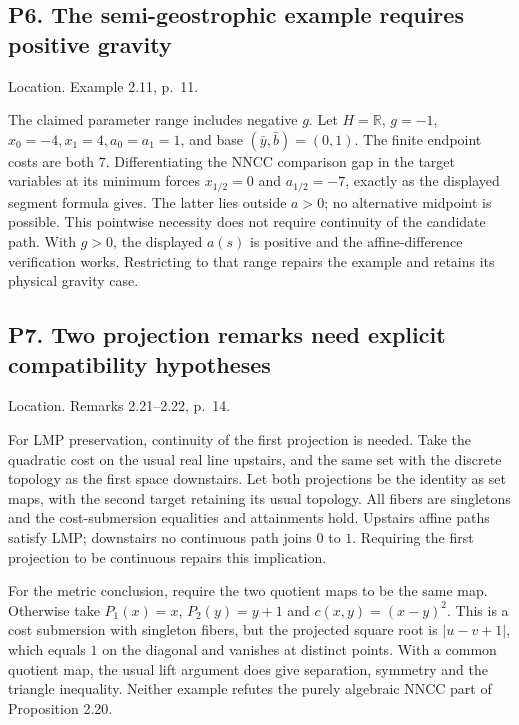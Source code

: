 \documentclass[10pt]{article}
\begin{document}
\subsection*{P6. The semi-geostrophic example requires positive gravity}
Location. Example 2.11, p. 11.\par
The claimed parameter range includes negative \(g\). Let \(H=\mathbb R\), \(g=-1\), \(x_0=-4,x_1=4,a_0=a_1=1\), and base \((\bar y,\bar b)=(0,1)\). The finite endpoint costs are both \(7\). Differentiating the NNCC comparison gap in the target variables at its minimum forces \(x_{1/2}=0\) and \(a_{1/2}=-7\), exactly as the displayed segment formula gives. The latter lies outside \(a>0\); no alternative midpoint is possible. This pointwise necessity does not require continuity of the candidate path. With \(g>0\), the displayed \(a(s)\) is positive and the affine-difference verification works. Restricting to that range repairs the example and retains its physical gravity case.\par
\subsection*{P7. Two projection remarks need explicit compatibility hypotheses}
Location. Remarks 2.21–2.22, p. 14.\par
For LMP preservation, continuity of the first projection is needed. Take the quadratic cost on the usual real line upstairs, and the same set with the discrete topology as the first space downstairs. Let both projections be the identity as set maps, with the second target retaining its usual topology. All fibers are singletons and the cost-submersion equalities and attainments hold. Upstairs affine paths satisfy LMP; downstairs no continuous path joins \(0\) to \(1\). Requiring the first projection to be continuous repairs this implication.\par
For the metric conclusion, require the two quotient maps to be the same map. Otherwise take \(P_1(x)=x\), \(P_2(y)=y+1\) and \(c(x,y)=(x-y)^2\). This is a cost submersion with singleton fibers, but the projected square root is \(|u-v+1|\), which equals \(1\) on the diagonal and vanishes at distinct points. With a common quotient map, the usual lift argument does give separation, symmetry and the triangle inequality. Neither example refutes the purely algebraic NNCC part of Proposition 2.20.\par
\end{document}
